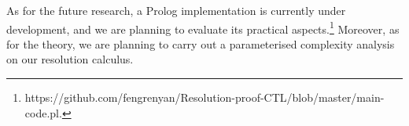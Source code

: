 \documentclass{article}
\begin{document}
As for the future research, a Prolog implementation is currently under development, and we are planning to evaluate its practical aspects.\footnote{https://github.com/fengrenyan/Resolution-proof-CTL/blob/master/main-code.pl.}
Moreover, as for the theory, we are planning to carry out a parameterised complexity analysis on our resolution calculus.




\end{document}
